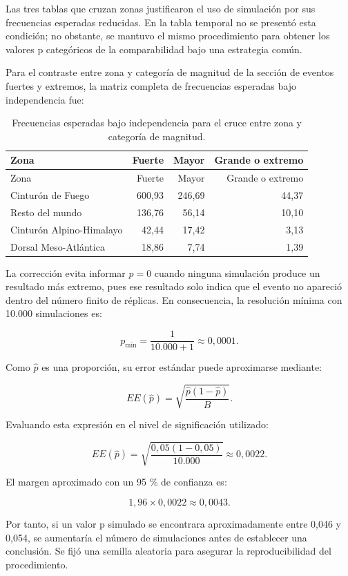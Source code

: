 \documentclass[
  spanish,
  letterpaper,
  DIV=11,
  numbers=noendperiod]{scrartcl}
\begin{document}
Las tres tablas que cruzan zonas justificaron el uso de simulación por
sus frecuencias esperadas reducidas. En la tabla temporal no se presentó
esta condición; no obstante, se mantuvo el mismo procedimiento para
obtener los valores p categóricos de la comparabilidad bajo una
estrategia común.

Para el contraste entre zona y categoría de magnitud de la sección de
eventos fuertes y extremos, la matriz completa de frecuencias esperadas
bajo independencia fue:

\begin{longtable}[]{@{}lrrr@{}}
\caption{Frecuencias esperadas bajo independencia para el cruce entre
zona y categoría de
magnitud.}\label{tbl-esperadas-extremos}\tabularnewline
\toprule\noalign{}
Zona & Fuerte & Mayor & Grande o extremo \\
\midrule\noalign{}
\endfirsthead
\toprule\noalign{}
Zona & Fuerte & Mayor & Grande o extremo \\
\midrule\noalign{}
\endhead
\bottomrule\noalign{}
\endlastfoot
Cinturón de Fuego & 600,93 & 246,69 & 44,37 \\
Resto del mundo & 136,76 & 56,14 & 10,10 \\
Cinturón Alpino-Himalayo & 42,44 & 17,42 & 3,13 \\
Dorsal Meso-Atlántica & 18,86 & 7,74 & 1,39 \\
\end{longtable}

La corrección evita informar \(p=0\) cuando ninguna simulación produce
un resultado más extremo, pues ese resultado solo indica que el evento
no apareció dentro del número finito de réplicas. En consecuencia, la
resolución mínima con 10.000 simulaciones es:

\[
p_{\min}=\frac{1}{10.000+1}\approx 0{,}0001.
\]

Como \(\widehat p\) es una proporción, su error estándar puede
aproximarse mediante:

\[
EE(\widehat p)=\sqrt{\frac{\widehat p(1-\widehat p)}{B}}.
\]

Evaluando esta expresión en el nivel de significación utilizado:

\[
EE(\widehat p)
=\sqrt{\frac{0{,}05(1-0{,}05)}{10.000}}
\approx 0{,}0022.
\]

El margen aproximado con un 95 \% de confianza es:

\[
1{,}96\times 0{,}0022\approx 0{,}0043.
\]

Por tanto, si un valor p simulado se encontrara aproximadamente entre
0,046 y 0,054, se aumentaría el número de simulaciones antes de
establecer una conclusión. Se fijó una semilla aleatoria para asegurar
la reproducibilidad del procedimiento.
\end{document}
